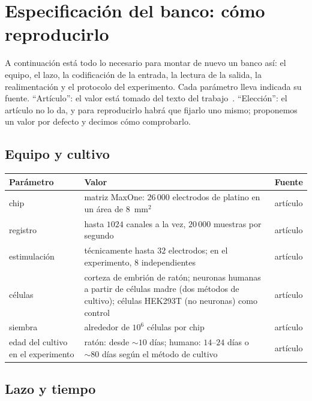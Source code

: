\section{Especificación del banco: cómo reproducirlo}
\label{sec:dishspec}

A continuación está todo lo necesario para montar de nuevo un banco así: el equipo, el lazo, la codificación de la entrada, la lectura de la salida, la realimentación y el protocolo del experimento. Cada parámetro lleva indicada su fuente. “Artículo”: el valor está tomado del texto del trabajo~\cite{Kagan2022}. “Elección”: el artículo no lo da, y para reproducirlo habrá que fijarlo uno mismo; proponemos un valor por defecto y decimos cómo comprobarlo.

\subsection*{Equipo y cultivo}

\begin{center}
\footnotesize
\setlength{\tabcolsep}{4pt}
\renewcommand{\arraystretch}{1.15}
\begin{tabular}{>{\raggedright}p{4.0cm}>{\raggedright}p{6.9cm}>{\raggedright\arraybackslash}p{1.6cm}}
\toprule
Parámetro & Valor & Fuente \\
\midrule
chip & matriz MaxOne: $26\,000$ electrodos de platino en un área de $8$~mm$^2$ & artículo \\
registro & hasta $1024$ canales a la vez, $20\,000$ muestras por segundo & artículo \\
estimulación & técnicamente hasta $32$ electrodos; en el experimento, $8$ independientes & artículo \\
células & corteza de embrión de ratón; neuronas humanas a partir de células madre (dos métodos de cultivo); células HEK293T (no neuronas) como control & artículo \\
siembra & alrededor de $10^6$ células por chip & artículo \\
edad del cultivo en el experimento & ratón: desde $\sim10$ días; humano: $14$--$24$ días o $\sim80$ días según el método de cultivo & artículo \\
\bottomrule
\end{tabular}
\end{center}

\subsection*{Lazo y tiempo}

